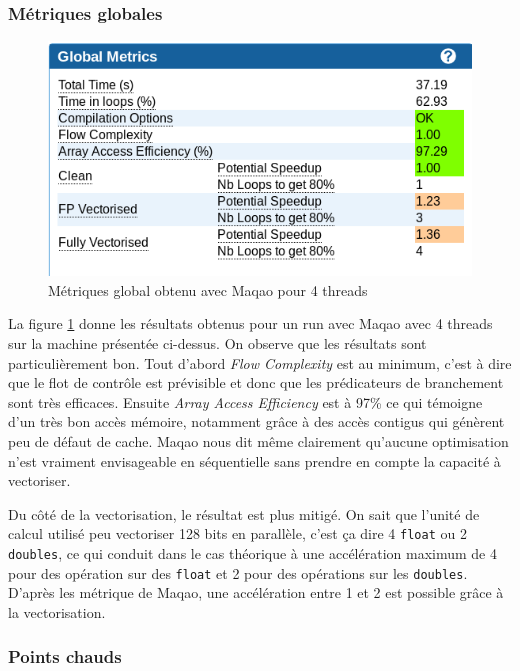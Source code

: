 \documentclass[11pt,a4paper]{article}
\begin{document}
		\subsubsection{Métriques globales}

			\begin{figure}[h!]
				\begin{center}
					\includegraphics{images/maqao_global_metrics.png}
					\caption{Métriques global obtenu avec Maqao pour 4 threads}
					\label{global_maqao}
				\end{center}
			\end{figure}

			La figure \ref{global_maqao} donne les résultats obtenus pour un run avec Maqao avec 4 threads sur la machine présentée ci-dessus. On observe que les résultats sont particulièrement bon. Tout d'abord \textit{Flow Complexity} est au minimum, c'est à dire que le flot de contrôle est prévisible et donc que les prédicateurs de branchement sont très efficaces. Ensuite \textit{Array Access Efficiency} est à 97\% ce qui témoigne d'un très bon accès mémoire, notamment grâce à des accès contigus qui génèrent peu de défaut de cache. Maqao nous dit même clairement qu'aucune optimisation n'est vraiment envisageable en séquentielle sans prendre en compte la capacité à vectoriser.

			Du côté de la vectorisation, le résultat est plus mitigé. On sait que l'unité de calcul utilisé peu vectoriser 128 bits en parallèle, c'est ça dire 4 \texttt{float} ou 2 \texttt{doubles}, ce qui conduit dans le cas théorique à une accélération maximum de 4 pour des opération sur des \texttt{float} et 2 pour des opérations sur les \texttt{doubles}. D'après les métrique de Maqao, une accélération entre 1 et 2 est possible grâce à la vectorisation.

		\subsubsection{Points chauds}
\end{document}
